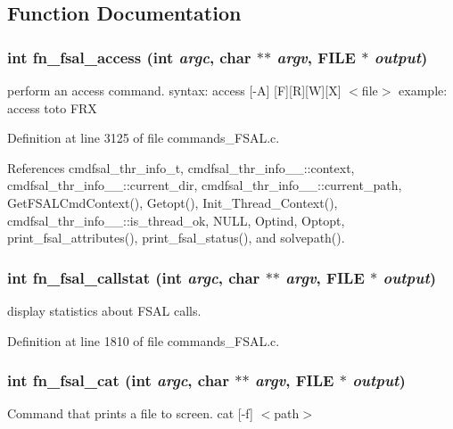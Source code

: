 \subsection{Function Documentation}
\subsubsection{\setlength{\rightskip}{0pt plus 5cm}int fn\_\-fsal\_\-access (int {\em argc}, char $\ast$$\ast$ {\em argv}, FILE $\ast$ {\em output})}\label{commands__FSAL_8c_a34}


perform an access command. syntax: access [-A] [F][R][W][X] $<$file$>$ example: access toto FRX 

Definition at line 3125 of file commands\_\-FSAL.c.

References cmdfsal\_\-thr\_\-info\_\-t, cmdfsal\_\-thr\_\-info\_\-\_\-::context, cmdfsal\_\-thr\_\-info\_\-\_\-::current\_\-dir, cmdfsal\_\-thr\_\-info\_\-\_\-::current\_\-path, Get\-FSALCmd\-Context(), Getopt(), Init\_\-Thread\_\-Context(), cmdfsal\_\-thr\_\-info\_\-\_\-::is\_\-thread\_\-ok, NULL, Optind, Optopt, print\_\-fsal\_\-attributes(), print\_\-fsal\_\-status(), and solvepath().
\subsubsection{\setlength{\rightskip}{0pt plus 5cm}int fn\_\-fsal\_\-callstat (int {\em argc}, char $\ast$$\ast$ {\em argv}, FILE $\ast$ {\em output})}\label{commands__FSAL_8c_a25}


display statistics about FSAL calls. 

Definition at line 1810 of file commands\_\-FSAL.c.
\subsubsection{\setlength{\rightskip}{0pt plus 5cm}int fn\_\-fsal\_\-cat (int {\em argc}, char $\ast$$\ast$ {\em argv}, FILE $\ast$ {\em output})}\label{commands__FSAL_8c_a43}


Command that prints a file to screen. cat [-f] $<$path$>$ 

